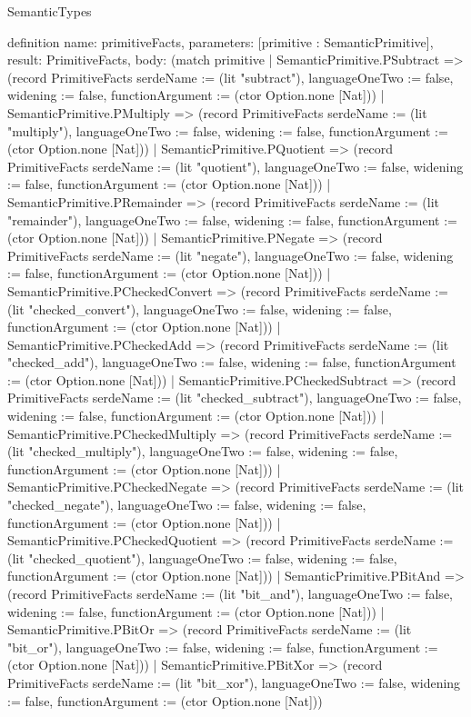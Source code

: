 \begin{lexlean}{SemanticTypes}
\begin{semanticmodule}
definition{
  name: primitiveFacts,
  parameters: [primitive : SemanticPrimitive],
  result: PrimitiveFacts,
  body: (match primitive
    | SemanticPrimitive.PSubtract => (record PrimitiveFacts {serdeName := (lit "subtract"), languageOneTwo := false, widening := false, functionArgument := (ctor Option.none [Nat])})
    | SemanticPrimitive.PMultiply => (record PrimitiveFacts {serdeName := (lit "multiply"), languageOneTwo := false, widening := false, functionArgument := (ctor Option.none [Nat])})
    | SemanticPrimitive.PQuotient => (record PrimitiveFacts {serdeName := (lit "quotient"), languageOneTwo := false, widening := false, functionArgument := (ctor Option.none [Nat])})
    | SemanticPrimitive.PRemainder => (record PrimitiveFacts {serdeName := (lit "remainder"), languageOneTwo := false, widening := false, functionArgument := (ctor Option.none [Nat])})
    | SemanticPrimitive.PNegate => (record PrimitiveFacts {serdeName := (lit "negate"), languageOneTwo := false, widening := false, functionArgument := (ctor Option.none [Nat])})
    | SemanticPrimitive.PCheckedConvert => (record PrimitiveFacts {serdeName := (lit "checked_convert"), languageOneTwo := false, widening := false, functionArgument := (ctor Option.none [Nat])})
    | SemanticPrimitive.PCheckedAdd => (record PrimitiveFacts {serdeName := (lit "checked_add"), languageOneTwo := false, widening := false, functionArgument := (ctor Option.none [Nat])})
    | SemanticPrimitive.PCheckedSubtract => (record PrimitiveFacts {serdeName := (lit "checked_subtract"), languageOneTwo := false, widening := false, functionArgument := (ctor Option.none [Nat])})
    | SemanticPrimitive.PCheckedMultiply => (record PrimitiveFacts {serdeName := (lit "checked_multiply"), languageOneTwo := false, widening := false, functionArgument := (ctor Option.none [Nat])})
    | SemanticPrimitive.PCheckedNegate => (record PrimitiveFacts {serdeName := (lit "checked_negate"), languageOneTwo := false, widening := false, functionArgument := (ctor Option.none [Nat])})
    | SemanticPrimitive.PCheckedQuotient => (record PrimitiveFacts {serdeName := (lit "checked_quotient"), languageOneTwo := false, widening := false, functionArgument := (ctor Option.none [Nat])})
    | SemanticPrimitive.PBitAnd => (record PrimitiveFacts {serdeName := (lit "bit_and"), languageOneTwo := false, widening := false, functionArgument := (ctor Option.none [Nat])})
    | SemanticPrimitive.PBitOr => (record PrimitiveFacts {serdeName := (lit "bit_or"), languageOneTwo := false, widening := false, functionArgument := (ctor Option.none [Nat])})
    | SemanticPrimitive.PBitXor => (record PrimitiveFacts {serdeName := (lit "bit_xor"), languageOneTwo := false, widening := false, functionArgument := (ctor Option.none [Nat])})
}
\end{semanticmodule}
\end{lexlean}
